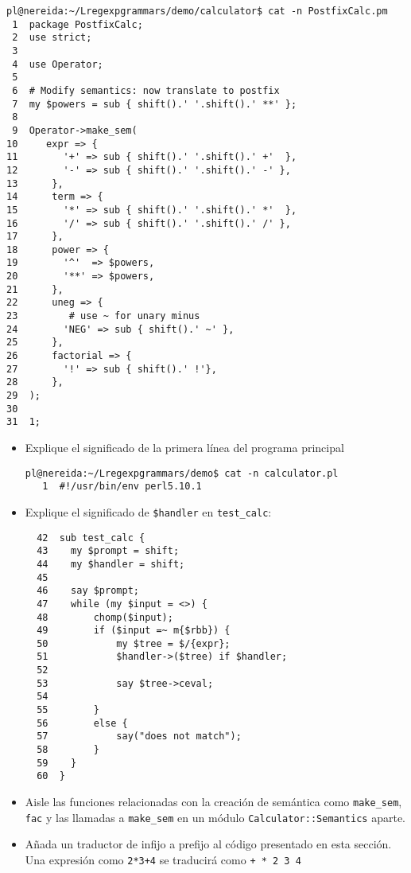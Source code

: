
\begin{verbatim}
pl@nereida:~/Lregexpgrammars/demo/calculator$ cat -n PostfixCalc.pm
 1  package PostfixCalc;
 2  use strict;
 3
 4  use Operator;
 5
 6  # Modify semantics: now translate to postfix
 7  my $powers = sub { shift().' '.shift().' **' };
 8
 9  Operator->make_sem(
10     expr => {
11        '+' => sub { shift().' '.shift().' +'  },
12        '-' => sub { shift().' '.shift().' -' },
13      },
14      term => {
15        '*' => sub { shift().' '.shift().' *'  },
16        '/' => sub { shift().' '.shift().' /' },
17      },
18      power => {
19        '^'  => $powers,
20        '**' => $powers,
21      },
22      uneg => {
23         # use ~ for unary minus
24        'NEG' => sub { shift().' ~' },
25      },
26      factorial => {
27        '!' => sub { shift().' !'},
28      },
29  );
30
31  1;
\end{verbatim}


\begin{exercise}
\begin{itemize}
\item Explique el significado de la primera línea del programa principal
\begin{verbatim}
pl@nereida:~/Lregexpgrammars/demo$ cat -n calculator.pl
   1  #!/usr/bin/env perl5.10.1
\end{verbatim}
\item Explique el significado de \verb|$handler| en \verb|test_calc|:
\begin{verbatim}
  42  sub test_calc {
  43    my $prompt = shift;
  44    my $handler = shift;
  45
  46    say $prompt;
  47    while (my $input = <>) {
  48        chomp($input);
  49        if ($input =~ m{$rbb}) {
  50            my $tree = $/{expr};
  51            $handler->($tree) if $handler;
  52
  53            say $tree->ceval;
  54
  55        }
  56        else {
  57            say("does not match");
  58        }
  59    }
  60  }
\end{verbatim}

\item Aisle las funciones relacionadas con la creación de semántica
como \verb|make_sem|, \verb|fac| y las llamadas a \verb|make_sem|
en un módulo \verb|Calculator::Semantics| aparte. 

\item Añada un traductor de infijo a prefijo al código presentado 
en esta sección. Una expresión como
\verb|2*3+4|  se traducirá como \verb|+ * 2 3 4|
\end{itemize}
\end{exercise}
  
